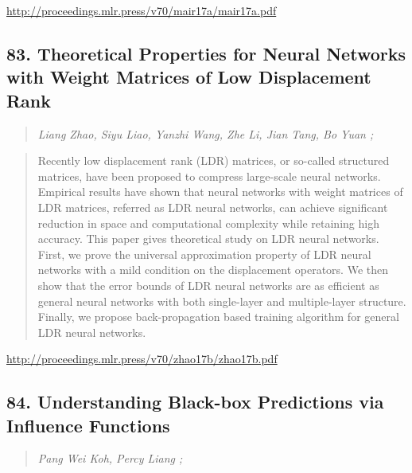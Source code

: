 \documentclass{article}
\begin{document}
\href{http://proceedings.mlr.press/v70/mair17a/mair17a.pdf}{http://proceedings.mlr.press/v70/mair17a/mair17a.pdf}

\subsection{83. Theoretical Properties for Neural Networks with Weight Matrices of Low Displacement Rank}

\begin{quote}
\footnotesize{\textit{Liang Zhao, Siyu Liao, Yanzhi Wang, Zhe Li, Jian Tang, Bo Yuan ;}}

\end{quote}

\begin{quote}
    Recently low displacement rank (LDR) matrices, or so-called structured matrices, have been proposed to compress large-scale neural networks. Empirical results have shown that neural networks with weight matrices of LDR matrices, referred as LDR neural networks, can achieve significant reduction in space and computational complexity while retaining high accuracy. This paper gives theoretical study on LDR neural networks. First, we prove the universal approximation property of LDR neural networks with a mild condition on the displacement operators. We then show that the error bounds of LDR neural networks are as efficient as general neural networks with both single-layer and multiple-layer structure. Finally, we propose back-propagation based training algorithm for general LDR neural networks.  
\end{quote}

\href{http://proceedings.mlr.press/v70/zhao17b/zhao17b.pdf}{http://proceedings.mlr.press/v70/zhao17b/zhao17b.pdf}

\subsection{84. Understanding Black-box Predictions via Influence Functions}

\begin{quote}
\footnotesize{\textit{Pang Wei Koh, Percy Liang ;}}

\end{quote}
\end{document}
